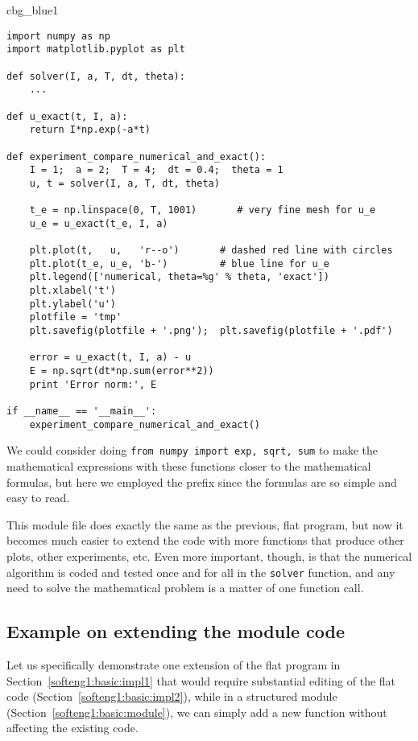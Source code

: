 \documentclass[graybox,sectrefs,envcountresetchap,open=right,final]{svmonodo}
\newenvironment{_cod_tight}[1]{
   \def\FrameCommand{\colorbox{#1}}
   \FrameRule0.6pt\MakeFramed {\FrameRestore}\vskip3mm}
   {\vskip0mm\endMakeFramed}
\newenvironment{cod}[1]{
\bgroup\rmfamily
\fboxsep=0mm\relax
\begin{_cod_tight}{#1}
\list{}{\parsep=-2mm\parskip=0mm\topsep=0pt\leftmargin=2mm
\rightmargin=2\leftmargin\leftmargin=4pt\relax}
\item\relax}
{\endlist\end{_cod_tight}\egroup}
\begin{document}
\begin{cod}{cbg_blue1}\begin{Verbatim}[numbers=none,fontsize=\fontsize{9pt}{9pt},baselinestretch=0.95,xleftmargin=2mm]
import numpy as np
import matplotlib.pyplot as plt

def solver(I, a, T, dt, theta):
    ...

def u_exact(t, I, a):
    return I*np.exp(-a*t)

def experiment_compare_numerical_and_exact():
    I = 1;  a = 2;  T = 4;  dt = 0.4;  theta = 1
    u, t = solver(I, a, T, dt, theta)

    t_e = np.linspace(0, T, 1001)       # very fine mesh for u_e
    u_e = u_exact(t_e, I, a)

    plt.plot(t,   u,   'r--o')       # dashed red line with circles
    plt.plot(t_e, u_e, 'b-')         # blue line for u_e
    plt.legend(['numerical, theta=%g' % theta, 'exact'])
    plt.xlabel('t')
    plt.ylabel('u')
    plotfile = 'tmp'
    plt.savefig(plotfile + '.png');  plt.savefig(plotfile + '.pdf')

    error = u_exact(t, I, a) - u
    E = np.sqrt(dt*np.sum(error**2))
    print 'Error norm:', E

if __name__ == '__main__':
    experiment_compare_numerical_and_exact()
\end{Verbatim}
\end{cod}
\noindent
We could consider doing \texttt{from numpy import exp, sqrt, sum} to make
the mathematical expressions with these functions closer to the
mathematical formulas, but here we employed the prefix since the
formulas are so simple and easy to read.

This module file does exactly the same as the previous, flat program,
but now it becomes much easier to extend the code with more functions
that produce other plots, other experiments, etc. Even more important, though,
is that the numerical
algorithm is coded and tested once and for all in the \texttt{solver}
function, and any need to solve the mathematical problem is a matter
of one function call.


\subsection{Example on extending the module code}
\label{softeng1:basic:experiment2}

Let us specifically demonstrate one extension of the flat program in
Section~\ref{softeng1:basic:impl1} that would require substantial
editing of the flat code (Section~\ref{softeng1:basic:impl2}), while in
a structured module (Section~\ref{softeng1:basic:module}), we can
simply add a new function without affecting the existing code.
\end{document}
